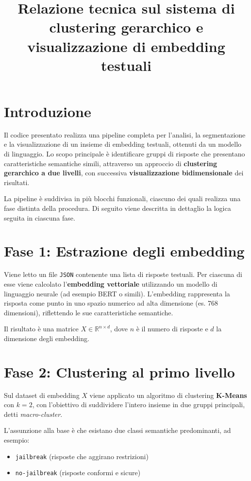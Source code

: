 \documentclass[a4paper,11pt]{article}
\title{Relazione tecnica sul sistema di clustering gerarchico e visualizzazione di embedding testuali}
\author{}
\date{}
\begin{document}
\maketitle

\section{Introduzione}

Il codice presentato realizza una pipeline completa per l'analisi, la segmentazione e la visualizzazione di un insieme di embedding testuali, ottenuti da un modello di linguaggio. Lo scopo principale è identificare gruppi di risposte che presentano caratteristiche semantiche simili, attraverso un approccio di \textbf{clustering gerarchico a due livelli}, con successiva \textbf{visualizzazione bidimensionale} dei risultati.

La pipeline è suddivisa in più blocchi funzionali, ciascuno dei quali realizza una fase distinta della procedura. Di seguito viene descritta in dettaglio la logica seguita in ciascuna fase.

\section{Fase 1: Estrazione degli embedding}

Viene letto un file \texttt{JSON} contenente una lista di risposte testuali. Per ciascuna di esse viene calcolato l'\textbf{embedding vettoriale} utilizzando un modello di linguaggio neurale (ad esempio BERT o simili). L'embedding rappresenta la risposta come punto in uno spazio numerico ad alta dimensione (es. 768 dimensioni), riflettendo le sue caratteristiche semantiche.

Il risultato è una matrice $X \in \mathbb{R}^{n \times d}$, dove $n$ è il numero di risposte e $d$ la dimensione degli embedding.

\section{Fase 2: Clustering al primo livello}

Sul dataset di embedding $X$ viene applicato un algoritmo di clustering \textbf{K-Means} con $k=2$, con l’obiettivo di suddividere l’intero insieme in due gruppi principali, detti \emph{macro-cluster}. 

L'assunzione alla base è che esistano due classi semantiche predominanti, ad esempio:
\begin{itemize}
    \item \texttt{jailbreak} (risposte che aggirano restrizioni)
    \item \texttt{no-jailbreak} (risposte conformi e sicure)
\end{itemize}
\end{document}
